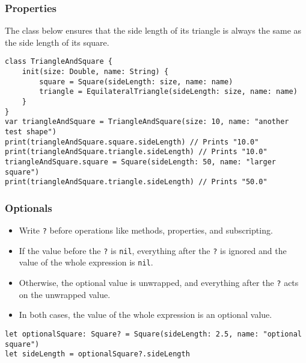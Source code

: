 \begin{frame}[fragile] \frametitle{Properties}

The class below ensures that the side length of its triangle is always the same as the side length of its square.

\begin{lstlisting}[basicstyle=\scriptsize]
class TriangleAndSquare {
    init(size: Double, name: String) {
        square = Square(sideLength: size, name: name)
        triangle = EquilateralTriangle(sideLength: size, name: name)
    }
}
var triangleAndSquare = TriangleAndSquare(size: 10, name: "another test shape")
print(triangleAndSquare.square.sideLength) // Prints "10.0"
print(triangleAndSquare.triangle.sideLength) // Prints "10.0"
triangleAndSquare.square = Square(sideLength: 50, name: "larger square")
print(triangleAndSquare.triangle.sideLength) // Prints "50.0"
\end{lstlisting}


\end{frame}

\begin{frame}[fragile] \frametitle{Optionals}

\begin{itemize}
\item Write \lstinline|?| before operations like methods, properties, and subscripting. 
\item If the value before the \lstinline|?| is \lstinline|nil|, everything after the \lstinline|?| is ignored and the value of the whole expression is \lstinline|nil|. 
\item Otherwise, the optional value is unwrapped, and everything after the \lstinline|?| acts on the unwrapped value. 
\item In both cases, the value of the whole expression is an optional value.
\end{itemize}

\begin{lstlisting}[basicstyle=\scriptsize]
let optionalSquare: Square? = Square(sideLength: 2.5, name: "optional square")
let sideLength = optionalSquare?.sideLength
\end{lstlisting}


\end{frame}

